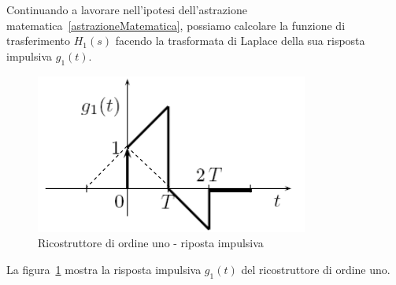 \documentclass[a4paper]{report}
\begin{document}
Continuando a lavorare nell'ipotesi dell'astrazione
matematica~\ref{astrazioneMatematica}, possiamo calcolare la funzione
di trasferimento $H_1(s)$ facendo la trasformata di Laplace della sua
risposta impulsiva $g_1(t)$.
\begin{figure}[!h]
  \begin{center}
    \includegraphics[scale=0.5]{./figures/ricostruttoreOrdineUno01.png}
    \caption{Ricostruttore di ordine uno - riposta
      impulsiva}\label{fig:ricostruttoreOrdineUno01} 
  \end{center}
\end{figure}
La figura~\ref{fig:ricostruttoreOrdineUno01} mostra la risposta
impulsiva $g_1(t)$ del ricostruttore di ordine uno.
\end{document}
